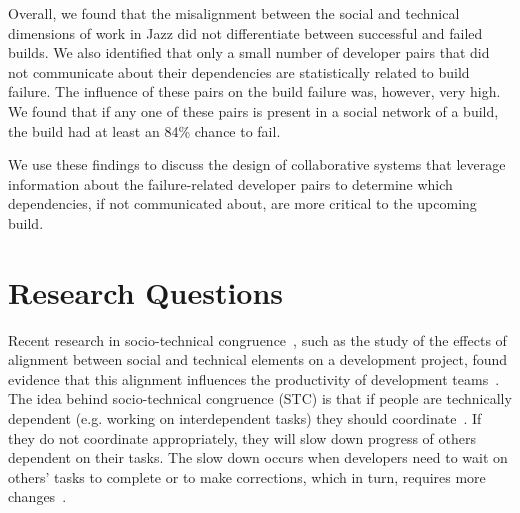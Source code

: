 \documentclass{sig-alternate}
\begin{document}
Overall, we found that the misalignment between the social and technical
dimensions of work in Jazz did not differentiate between successful and failed
builds. We also identified that only a small number of developer pairs
that did not communicate about their dependencies are statistically related to
build failure. The influence of these pairs on the build failure was, however,
very high. We found that if any one of these pairs is present in a
social network of a build, the build had at least an 84\% chance to fail. 

We
use these findings to discuss the design of collaborative systems that leverage
information about the failure-related developer pairs to determine which
dependencies, if not communicated about, are more critical to the upcoming
build. 





\section{Research Questions}
Recent research in socio-technical congruence~\cite{cataldo:cscw:2006}, such
as the study of the effects of alignment between social and technical elements
on a development project, found evidence that this alignment influences the
productivity of development teams~\cite{cataldo:cscw:2006}. The idea behind socio-technical congruence (STC) is that if people are technically dependent (e.g. working on interdependent tasks) they should coordinate~\cite{conway:datamination:1968}. If they do not coordinate appropriately, they will slow down progress of others dependent on their tasks. 
%
The slow down occurs when developers need to wait on others' tasks to complete or to make corrections, which in turn, requires more changes~\cite{ehrlich:stc:2008}.

\end{document}
